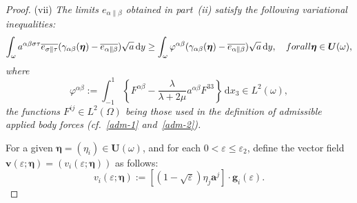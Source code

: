 \documentclass{amsart}
\def\dd{\, \mathrm{d}}
\begin{document}
\begin{proof}
(vii) \emph{The limits $e_{\alpha\|\beta}$ obtained in part~(ii) satisfy the following variational inequalities:}
\begin{equation*}
	\int_{\omega} a^{\alpha\beta\sigma\tau} \overline{e_{\sigma\|\tau}} (\gamma_{\alpha\beta}(\bm{\eta})-\overline{e_{\alpha\|\beta}}) \sqrt{a} \dd y \ge \int_{\omega} \varphi^{\alpha\beta} (\gamma_{\alpha\beta}(\bm{\eta})-\overline{e_{\alpha\|\beta}}) \sqrt{a} \dd y,\quad\textup{ for all }\bm{\eta} \in\bm{U}(\omega),
\end{equation*}
\emph{where}
\begin{equation*}
	\varphi^{\alpha\beta}:=\int_{-1}^{1} \left\{F^{\alpha\beta}-\dfrac{\lambda}{\lambda+2\mu}a^{\alpha\beta} F^{33}\right\} \dd x_3 \in L^2(\omega),
\end{equation*}
\emph{the functions $F^{ij} \in L^2(\Omega)$ being those used in the definition of admissible applied body forces (cf.~\eqref{adm-1} and~\eqref{adm-2}).}

For a given $\bm{\eta}=(\eta_i) \in \bm{U}(\omega)$, and for each $0<\varepsilon\le \varepsilon_2$, define the vector field $\bm{v}(\varepsilon;\bm{\eta})=(v_i(\varepsilon;\bm{\eta}))$ as follows:
\begin{equation*}
	v_i(\varepsilon;\bm{\eta}):=\left[(1-\sqrt{\varepsilon}) \eta_j\bm{a}^j\right]\cdot\bm{g}_i(\varepsilon).
\end{equation*}


\end{proof}
\end{document}
